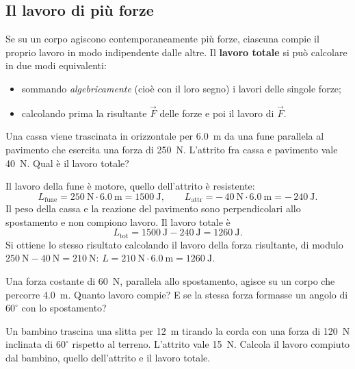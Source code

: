 \subsection{Il lavoro di più forze}

Se su un corpo agiscono contemporaneamente più forze, ciascuna compie il proprio lavoro in modo indipendente dalle altre. Il \textbf{lavoro totale} si può calcolare in due modi equivalenti:
\begin{itemize}
    \item sommando \emph{algebricamente} (cioè con il loro segno) i lavori delle singole forze;
    \item calcolando prima la risultante $\vec F$ delle forze e poi il lavoro di $\vec F$.
\end{itemize}

\begin{testexample}
Una cassa viene trascinata in orizzontale per \SI{6,0}{\metre} da una fune parallela al pavimento che esercita una forza di \SI{250}{\newton}. L'attrito fra cassa e pavimento vale \SI{40}{\newton}. Qual è il lavoro totale?

Il lavoro della fune è motore, quello dell'attrito è resistente:
\[ L_{\text{fune}} = \SI{250}{\newton} \cdot \SI{6,0}{\metre} = \SI{1500}{\joule}, \qquad L_{\text{attr}} = -\,\SI{40}{\newton} \cdot \SI{6,0}{\metre} = -\,\SI{240}{\joule}. \]
Il peso della cassa e la reazione del pavimento sono perpendicolari allo spostamento e non compiono lavoro. Il lavoro totale è
\[ L_{\text{tot}} = \SI{1500}{\joule} - \SI{240}{\joule} = \SI{1260}{\joule}. \]
Si ottiene lo stesso risultato calcolando il lavoro della forza risultante, di modulo $\SI{250}{\newton} - \SI{40}{\newton} = \SI{210}{\newton}$: $L = \SI{210}{\newton} \cdot \SI{6,0}{\metre} = \SI{1260}{\joule}$.
\end{testexample}

\begin{esercizio}
Una forza costante di \SI{60}{\newton}, parallela allo spostamento, agisce su un corpo che percorre \SI{4,0}{\metre}. Quanto lavoro compie? E se la stessa forza formasse un angolo di $60^\circ$ con lo spostamento?\\
\end{esercizio}

\begin{esercizio}
Un bambino trascina una slitta per \SI{12}{\metre} tirando la corda con una forza di \SI{120}{\newton} inclinata di $60^\circ$ rispetto al terreno. L'attrito vale \SI{15}{\newton}. Calcola il lavoro compiuto dal bambino, quello dell'attrito e il lavoro totale.\\
\end{esercizio}

